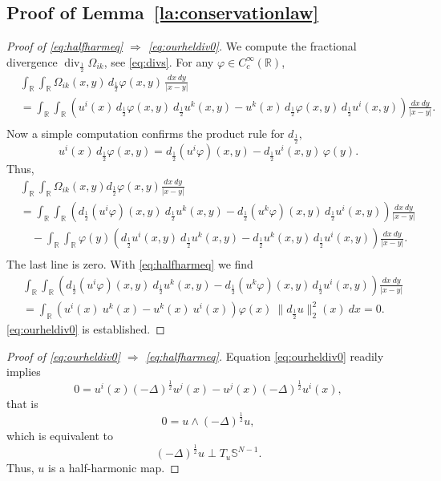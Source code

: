 \documentclass[12pt]{amsart}
\def\S{{\mathbb S}}
\theoremstyle{definition}
\newcommand{\R}{\mathbb{R}}
\newcommand{\brac}[1]{\left (#1 \right )}
\numberwithin{theorem}{section} \numberwithin{equation}{section}
\renewcommand{\div}{\operatorname{div}}
\newcommand{\lap}{\Delta }
\newcommand{\laph}{(-\lap)^{\frac{1}{2}}}
\begin{document}
\subsection{Proof of Lemma~\ref{la:conservationlaw}}
\begin{proof}[Proof of \eqref{eq:halfharmeq} $\Rightarrow$ \eqref{eq:ourheldiv0}]
We compute the fractional divergence  $\div_{\frac{1}{2}} \Omega_{ik}$, see \eqref{eq:divs}. For any $\varphi \in C_c^\infty(\R)$,
\[
\begin{split}
  &\int_{\R}\int_{\R} \Omega_{ik}(x,y)\, d_{\frac{1}{2}} \varphi(x,y)\, \frac{dx\ dy}{|x-y|} \\
  &=\int_{\R}\int_{\R} \brac{u^i(x)\, d_{\frac{1}{2}} \varphi(x,y)\ d_{\frac{1}{2}} u^k(x,y) - u^k(x)\, d_{\frac{1}{2}} \varphi(x,y)\, d_{\frac{1}{2}} u^i(x,y)} \frac{dx\ dy}{|x-y|}. \\
\end{split}
 \]
Now a simple computation confirms the product rule for $d_{\frac{1}{2}}$,
\[
 u^i(x)\, d_{\frac{1}{2}} \varphi(x,y) = d_{\frac{1}{2}} (u^i \varphi)(x,y) - d_{\frac{1}{2}} u^i(x,y)\, \varphi(y).
\]
Thus, 
\[
\begin{split}
  &\int_{\R}\int_{\R} \Omega_{ik}(x,y) d_{\frac{1}{2}} \varphi(x,y)\frac{dx\ dy}{|x-y|} \\
  &=\int_{\R}\int_{\R} \brac{d_{\frac{1}{2}} (u^i\varphi)(x,y)\ d_{\frac{1}{2}} u^k(x,y) - d_{\frac{1}{2}} (u^k\varphi)(x,y)\, d_{\frac{1}{2}} u^i(x,y)} \frac{dx\ dy}{|x-y|} \\
  &\quad -\int_{\R}\int_{\R} \varphi(y)\brac{ d_{\frac{1}{2}} u^i(x,y)\ d_{\frac{1}{2}} u^k(x,y) - d_{\frac{1}{2}} u^k(x,y)\, d_{\frac{1}{2}} u^i(x,y)} \frac{dx\ dy}{|x-y|}. \\
\end{split}
 \]
The last line is zero. With \eqref{eq:halfharmeq} we find
\[
\begin{split}
 &\int_{\R}\int_{\R} \brac{d_{\frac{1}{2}} (u^i\varphi)(x,y)\ d_{\frac{1}{2}} u^k(x,y) - d_{\frac{1}{2}} (u^k\varphi)(x,y)\, d_{\frac{1}{2}} u^i(x,y)} \frac{dx\ dy}{|x-y|}\\
 &=\int_{\R} \brac{u^i(x)\ u^k(x)  - u^k(x)\ u^i(x)  } \varphi(x)\ \|d_{\frac{1}{2}} u\|_2^2(x)\ dx = 0.
\end{split}
\]
\eqref{eq:ourheldiv0} is established.
\end{proof}

\begin{proof}[Proof of \eqref{eq:ourheldiv0} $\Rightarrow$ \eqref{eq:halfharmeq}]
Equation \eqref{eq:ourheldiv0} readily implies 
\[
 0=u^i(x) \laph u^j(x) - u^j(x) \laph u^i(x),
\]
that is
\[
 0 = u \wedge \laph u,
\]
which is equivalent to
\[
 \laph u \perp T_u \S^{N-1}.
\]
Thus, $u$ is a half-harmonic map.
\end{proof}
\end{document}
